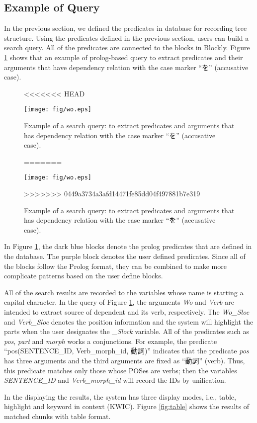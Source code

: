 \documentclass[conference]{IEEEtran}
\begin{document}
\subsection{Example of Query}
\label{sec:example}
In the previous section, we defined the predicates in database for recording tree structure.
Using the predicates defined in the previous section,
users can build a search query. All of the predicates are connected to the blocks
in Blockly. Figure \ref{fig:pattern} shows that an example of prolog-based query to extract predicates and their arguments that have dependency relation with the case marker ``を'' (accusative case).

\begin{figure}[htbp]
<<<<<<< HEAD
\centerline{\texttt{[image: fig/wo.eps]}}
\caption{Example of a search query: to extract predicates and arguments that has dependency relation with the case marker ``を'' (accusative case).}
\label{fig:pattern}
=======
  \centerline{\texttt{[image: fig/wo.eps]}}
  \caption{Example of a search query: to extract predicates and arguments that has dependency relation with the case marker ``を'' (accusative case).}
  \label{fig:pattern}
>>>>>>> 0449a3734a3afd14471fe85dd04f497881b7e319
\end{figure}

In Figure \ref{fig:pattern}, the dark blue blocks denote the prolog predicates that are defined
in the database. The purple block denotes the user defined predicates. Since all of the blocks
follow the Prolog format, they can be combined to make more complicate patterns based on the user define blocks.

All of the search results are recorded to the variables whose name is starting a capital character.
In the query of Figure \ref{fig:pattern}, the arguments {\it Wo} and {\it Verb} are intended
to extract source of dependent and its verb, respectively.
The {\it Wo\_Sloc} and {\it Verb\_Sloc} denotes the position information and the system
will highlight the parts when the user designates the {\it \_Slock} variable.
All of the predicates such as {\it pos}, {\it part} and {\it morph} works a conjunctions.
For example, the predicate ``pos(SENTENCE\_ID, Verb\_morph\_id, 動詞)'' indicates that
the predicate {\it pos} has three arguments and the third arguments are fixed as ``動詞'' (verb).
Thus, this predicate matches only those whose POSes are verbs; then the variables
  {\it SENTENCE\_ID} and {\it Verb\_morph\_id} will record the IDs by unification.


In the displaying the results, the system has three display modes, i.e.,
table, highlight and keyword in context (KWIC).
Figure \ref{fig:table} shows the results of matched chunks with table format.
\end{document}
